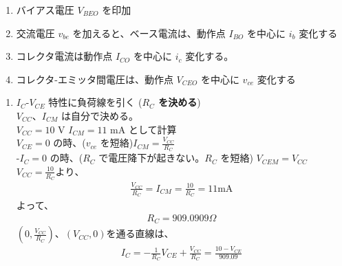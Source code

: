 \begin{enumerate}
  \setlength{\parskip}{0cm} %
  \setlength{\itemsep}{0cm} %
  \item バイアス電圧 $V_{BEO}$ を印加
  \item 交流電圧 $v_{be}$ を加えると、ベース電流は、動作点 $I_{BO}$ を中心に $i_b$ 変化する
  \item コレクタ電流は動作点 $I_{CO}$ を中心に $i_c$ 変化する。
  \item コレクタ-エミッタ間電圧は、動作点 $V_{CEO}$ を中心に $v_{ce}$ 変化する
\end{enumerate}
\begin{enumerate}
  \setlength{\parskip}{0cm} %
  \setlength{\itemsep}{0cm} %
  \item $I_C$-$V_{CE}$ 特性に負荷線を引く (\textbf{$R_C$ を決める})\\
  $V_{CC}$、$I_{CM}$ は自分で決める。\\
  $V_{CC} = 10$ V $I_{CM} = 11$ mA として計算\\
  $V_{CE} = 0$ の時、($v_{ce}$ を短絡)$I_{CM} = \frac{V_{CC}}{R_C}$\\
  -$I_C = 0$ の時、($R_C$ で電圧降下が起きない。$R_C$ を短絡) $V_{CEM} = V_{CC}$\\
  $V_{CC} = \frac{10}{R_C}  より、$
  \begin{align}
    \frac{V_{CC}}{R_C} = I_{CM} = \frac{10}{R_C} = 11 \textrm{mA}
  \end{align}
  よって、
  \begin{align}
    R_C = 909.0909 \Omega
  \end{align}
  $(0, \frac{V_{CC}}{R_C})$、$(V_{CC}, 0)$を通る直線は、
  \begin{align}
    I_C = - \frac{1}{R_C} V_{CE} + \frac{V_{CC}}{R_C} = \frac{10 - V_{CE}}{909.09}
  \end{align}


\end{enumerate}
